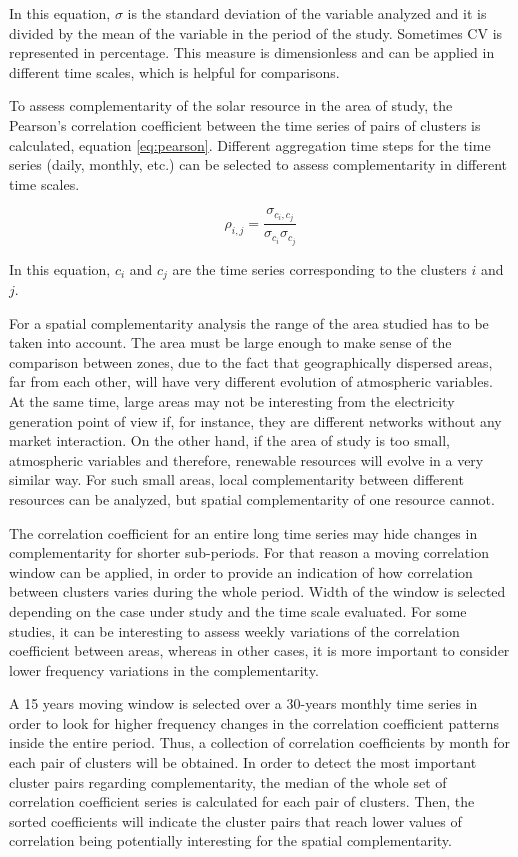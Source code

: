 In this equation, $\sigma$ is the standard deviation of the variable analyzed and it is divided by the mean of the variable in the period of the study. Sometimes CV is represented in percentage. This measure is dimensionless and can be applied in different time scales, which is helpful for comparisons.

To assess complementarity of the solar resource in the area of study, the Pearson's correlation coefficient between the time series of pairs of clusters is calculated, equation \ref{eq:pearson}. Different aggregation time steps for the time series (daily, monthly, etc.) can be selected to assess complementarity in different time scales. 

\begin{equation}\label{eq:pearson}
  \rho_{i,j}=\frac{\sigma_{c_i,c_j}}{\sigma_{c_i}\sigma_{c_j}}
\end{equation}

In this equation, $c_i$ and $c_j$ are the time series corresponding to the clusters $i$ and $j$.

For a spatial complementarity analysis the range of the area studied has to be taken into account. The area must be large enough to make sense of the comparison between zones, due to the fact that geographically dispersed areas, far from each other, will have very different evolution of atmospheric variables. At the same time, large areas may not be interesting from the electricity generation point of view if, for instance, they are different networks without any market interaction. On the other hand, if the area of study is too small, atmospheric variables and therefore, renewable resources will evolve in a very similar way. For such small areas, local complementarity between different resources can be analyzed, but spatial complementarity of one resource cannot.

The correlation coefficient for an entire long time series may hide changes in complementarity for shorter sub-periods. For that reason a moving correlation window can be applied, in order to provide an indication of how correlation between clusters varies during the whole period. Width of the window is selected depending on the case under study and the time scale evaluated. For some studies, it can be interesting to assess weekly variations of the correlation coefficient between areas, whereas in other cases, it is more important to consider lower frequency variations in the complementarity.

A 15 years moving window is selected over a 30-years monthly time series in order to look for higher frequency changes in the correlation coefficient patterns inside the entire period. Thus, a collection of correlation coefficients by month for each pair of clusters will be obtained. In order to detect the most important cluster pairs regarding complementarity, the median of the whole set of correlation coefficient series is calculated for each pair of clusters. Then, the  sorted coefficients will indicate the cluster pairs that reach lower values of correlation being potentially interesting for the spatial complementarity.

